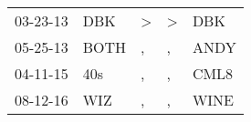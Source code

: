 \begin{supertabular}{lllll}
 03-23-13 &   DBK &  \textgreater &  \textgreater &   DBK \\
 05-25-13 &  BOTH &             , &             , &  ANDY \\
 04-11-15 &   40s &             , &             , &  CML8 \\
 08-12-16 &   WIZ &             , &             , &  WINE \\
\end{supertabular}

